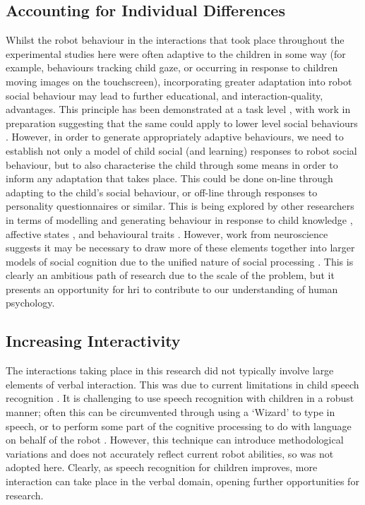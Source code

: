 \subsection{Accounting for Individual Differences}
Whilst the robot behaviour in the interactions that took place throughout the experimental studies here were often adaptive to the children in some way (for example, behaviours tracking child gaze, or occurring in response to children moving images on the touchscreen), incorporating greater adaptation into robot social behaviour may lead to further educational, and interaction-quality, advantages. This principle has been demonstrated at a task level \citep{coninx2015towards}, with work in preparation suggesting that the same could apply to lower level social behaviours \citep{baxter2016robot}. However, in order to generate appropriately adaptive behaviours, we need to establish not only a model of child social (and \gls{learning}) responses to robot social behaviour, but to also characterise the child through some means in order to inform any adaptation that takes place. This could be done on-line through adapting to the child's social behaviour, or off-line through responses to personality questionnaires or similar. This is being explored by other researchers in terms of modelling and generating behaviour in response to child knowledge \citep{jones2015open}, affective states \citep{spaulding2016affect}, and behavioural traits \citep{baxter2016robot}. However, work from neuroscience suggests it may be necessary to draw more of these elements together into larger models of social cognition \citep{pfeiffer2013gaze} due to the unified nature of social processing \citep{zaki2013cue}. This is clearly an ambitious path of research due to the scale of the problem, but it presents an opportunity for \acrshort{hri} to contribute to our understanding of human psychology.

\subsection{Increasing Interactivity}
The interactions taking place in this research did not typically involve large elements of verbal interaction. This was due to current limitations in child speech recognition \citep{kennedy2014chatbot}. It is challenging to use speech recognition with children in a robust manner; often this can be circumvented through using a `Wizard' to type in speech, or to perform some part of the cognitive processing to do with language on behalf of the robot \citep{baxter2016althri}. However, this technique can introduce methodological variations and does not accurately reflect current robot abilities, so was not adopted here. Clearly, as speech recognition for children improves, more interaction can take place in the verbal domain, opening further opportunities for research.

